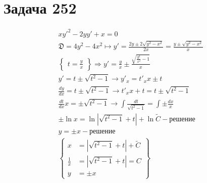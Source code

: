 \section{Задача 252}

\begin{gather}
xy'^2-2yy'+x=0\\
\mathfrak{D} =4y^2-4x^2\longmapsto y'=\frac{2y\pm2\sqrt{y^2-x^2}}{2x}=\frac{y\pm\sqrt{y^2-x^2}}{x}\\
\left\{
            \begin{aligned}
                t=\frac{y}{x}
            \end{aligned}
        \right\}\Longrightarrow y'=\frac{y}{x}\pm\frac{\sqrt{\frac{y^2}{x^2}-1}}{x}\\
        y'=t\pm\sqrt{t^2-1}\longrightarrow y'_x=t'_xx\pm t\\
        \frac{dy}{dx}=t\pm\sqrt{t^2-1}\longrightarrow t'_xx+t=t\pm \sqrt{t^2-1}\\
        \frac{dt}{dx}x=\pm\sqrt{t^2-1}\longrightarrow \int\frac{dt}{\sqrt{t^2-1}}=\int\pm\frac{dx}{x}\\
        \pm\ln x=\ln|\sqrt{t^2-1}+t|+\ln{\widetilde{C}}-\text{решение}\\
        y=\pm x-\text{решение}\\
        \left\{
            \begin{aligned}
                x &=|\sqrt{t^2-1}+t|+\widetilde{C} \\
                \frac{1}{x} &=|\sqrt{t^2-1}+t|=C \\
                y &= \pm x
            \end{aligned}
        \right\}
\end{gather}


